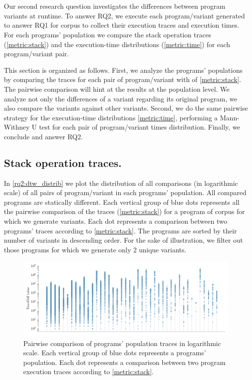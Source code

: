 \section{\rqtwo}



Our second research question investigates the differences between program variants at runtime.
To answer RQ2, we execute each program/variant generated to answer RQ1 for \corpusrosetta corpus to collect their execution traces and execution times.
For each programs' population we compare the stack operation traces (\autoref{metric:stack}) and the execution-time distributions (\autoref{metric:time}) for each program/variant pair.

This section is organized as follows. First, we analyze the programs' populations by comparing the traces for each pair of program/variant with \DTW of \autoref{metric:stack}. The pairwise comparison will hint at the results at the population level. We analyze not only the differences of a variant regarding its original program, we also compare the variants against other variants. Second, we do the same pairwise strategy for the execution-time distributions \autoref{metric:time}, performing a Mann-Withney U test for each pair of program/variant times distribution. Finally, we conclude and answer RQ2.

\subsection{Stack operation traces.}


In \autoref{rq2:dtw_distrib} we plot the distribution of all comparisons (in logarithmic scale) of all pairs of program/variant in each programs' population. All compared programs are statically different. Each vertical group of blue dots  represents all the pairwise comparison of the traces (\autoref{metric:stack}) for a program of \corpusrosetta corpus for which we generate variants.
Each dot represents a comparison between two programs' traces according to \autoref{metric:stack}. 
The programs are sorted by their number of variants in descending order. For the sake of illustration, we filter out those programs for which we generate only 2 unique variants. 

\begin{figure}[h]
    \centering
    \includegraphics[width=\linewidth]{plots/plot_distribs1.png}
    \caption{Pairwise comparison of programs' population traces in logarithmic scale. Each vertical group of blue dots represents a programs' population. Each dot represents a comparison between two program execution traces according to \autoref{metric:stack}. }
    \label{rq2:dtw_distrib}
\end{figure}

